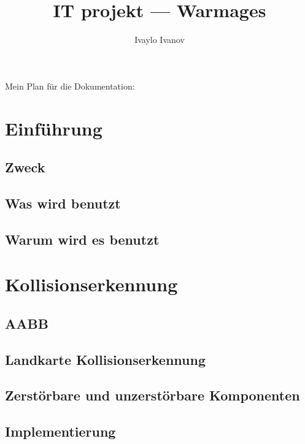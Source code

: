\documentclass {article}
\title{IT projekt --- Warmages}
\author{Ivaylo Ivanov}
\begin{document}
\maketitle
{}
\newpage
{}


Mein Plan für die Dokumentation:
\section{Einführung}
\subsection{Zweck}
\subsection{Was wird benutzt}
\subsection{Warum wird es benutzt}
\section{Kollisionserkennung}
\subsection{AABB}
\subsection{Landkarte Kollisionserkennung}
\subsection{Zerstörbare und unzerstörbare Komponenten}
\subsection{Implementierung}
\end{document}
